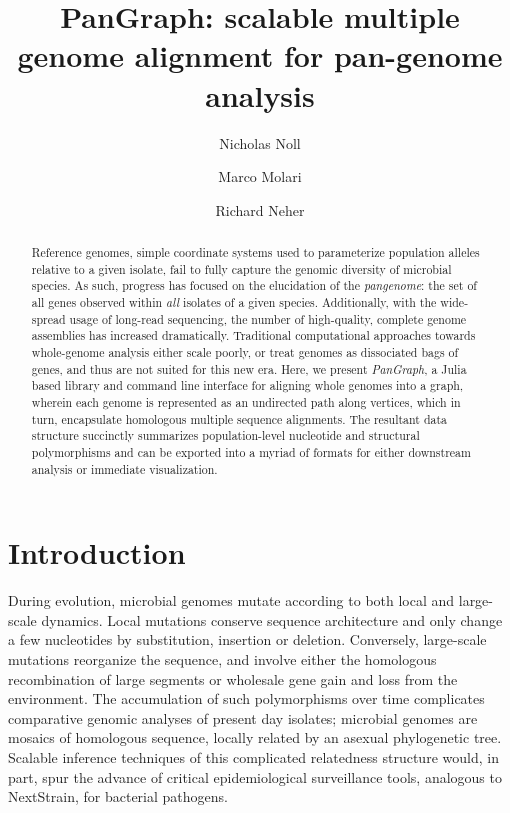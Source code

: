 \documentclass[aps,rmp,reprint,superscriptaddress,notitlepage,10pt]{revtex4-1}
\begin{document}
\title{PanGraph: scalable multiple genome alignment for pan-genome analysis}
\author{Nicholas Noll}
\author{Marco Molari}
\author{Richard Neher}

\begin{abstract}
Reference genomes, simple coordinate systems used to parameterize population alleles relative to a given isolate, fail to fully capture the genomic diversity of microbial species.
As such, progress has focused on the elucidation of the \emph{pangenome}: the set of all genes observed within \emph{all} isolates of a given species.
Additionally, with the wide-spread usage of long-read sequencing, the number of high-quality, complete genome assemblies has increased dramatically.
Traditional computational approaches towards whole-genome analysis either scale poorly, or treat genomes as dissociated bags of genes, and thus are not suited for this new era.
Here, we present \emph{PanGraph}, a Julia based library and command line interface for aligning whole genomes into a graph, wherein each genome is represented as an undirected path along vertices, which in turn, encapsulate homologous multiple sequence alignments.
The resultant data structure succinctly summarizes population-level nucleotide and structural polymorphisms and can be exported into a myriad of formats for either downstream analysis or immediate visualization.
\end{abstract}

\maketitle

\section{Introduction}
During evolution, microbial genomes mutate according to both local and large-scale dynamics.
Local mutations conserve sequence architecture and only change a few nucleotides by substitution, insertion or deletion.
Conversely, large-scale mutations reorganize the sequence, and involve either the homologous recombination of large segments or wholesale gene gain and loss from the environment.
The accumulation of such polymorphisms over time complicates comparative genomic analyses of present day isolates; microbial genomes are mosaics of homologous sequence, locally related by an asexual phylogenetic tree.
Scalable inference techniques of this complicated relatedness structure would, in part, spur the advance of critical epidemiological surveillance tools, analogous to NextStrain, for bacterial pathogens.
\end{document}
